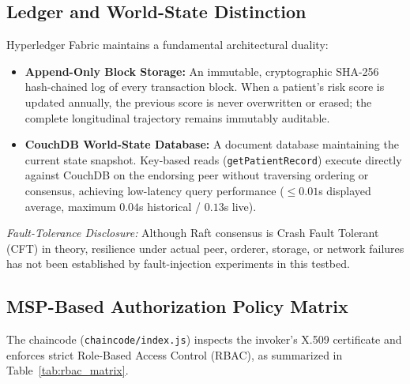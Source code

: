 \documentclass[runningheads]{llncs}
\begin{document}
\subsection{Ledger and World-State Distinction}
Hyperledger Fabric maintains a fundamental architectural duality:
\begin{itemize}
    \item \textbf{Append-Only Block Storage:} An immutable, cryptographic SHA-256 hash-chained log of every transaction block. When a patient's risk score is updated annually, the previous score is never overwritten or erased; the complete longitudinal trajectory remains immutably auditable.
    \item \textbf{CouchDB World-State Database:} A document database maintaining the current state snapshot. Key-based reads (\texttt{getPatientRecord}) execute directly against CouchDB on the endorsing peer without traversing ordering or consensus, achieving low-latency query performance ($\le 0.01$s displayed average, maximum $0.04$s historical / $0.13$s live).
\end{itemize}

\noindent\textit{Fault-Tolerance Disclosure:} Although Raft consensus is Crash Fault Tolerant (CFT) in theory, resilience under actual peer, orderer, storage, or network failures has not been established by fault-injection experiments in this testbed.

\subsection{MSP-Based Authorization Policy Matrix}
The chaincode (\texttt{chaincode/index.js}) inspects the invoker's X.509 certificate and enforces strict Role-Based Access Control (RBAC), as summarized in Table~\ref{tab:rbac_matrix}.
\end{document}
